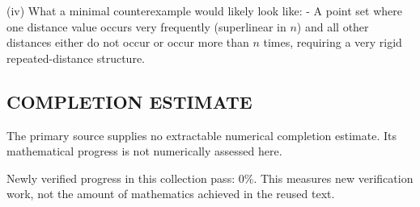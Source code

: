 (iv) What a minimal counterexample would likely look like:
- A point set where one distance value occurs very frequently (superlinear in $n$) and all other distances either do not occur or occur more than $n$ times, requiring a very rigid repeated-distance structure.




\subsection*{COMPLETION ESTIMATE}
The primary source supplies no extractable numerical completion estimate. Its mathematical progress is not numerically assessed here.

Newly verified progress in this collection pass: $0\%$. This measures new verification work, not the amount of mathematics achieved in the reused text.
